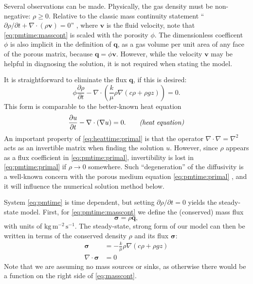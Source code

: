\documentclass[11pt]{amsart}
\newcommand{\bq}{\mathbf{q}}
\newcommand{\bv}{\mathbf{v}}
\newcommand{\bsigma}{\bm{\sigma}}
\newcommand{\Div}{\nabla\cdot}
\newcommand{\grad}{\nabla}
\begin{document}
Several observations can be made.  Physically, the gas density must be non-negative: $\rho\ge 0$.  Relative to the classic mass continuity statement ``$\partial\rho/\partial t + \Div(\rho \bv)=0$'' \citep[for example]{Tadmor2012}, where $\bv$ is the fluid velocity, note that \eqref{eq:pmtime:masscont} is scaled with the porosity $\phi$.  The dimensionless coefficent $\phi$ is also implicit in the definition of $\bq$, as a gas volume per unit area of any face of the porous matrix, because $\bq = \phi \bv$.  However, while the velocity $\bv$ may be helpful in diagnosing the solution, it is not required when stating the model.

It is straightforward to eliminate the flux $\bq$, if this is desired:
\begin{equation}
\phi \frac{\partial \rho}{\partial t} - \Div \left(\frac{k}{\mu} \rho \grad\left(c \rho + \rho g z\right)\right) = 0. \label{eq:pmtime:primal}
\end{equation}
This form is comparable to the better-known heat equation
\begin{equation}
\frac{\partial u}{\partial t} - \Div(\grad u) = 0. \qquad \text{\emph{(heat equation)}}\label{eq:heattime:primal}
\end{equation}
An important property of \eqref{eq:heattime:primal} is that the operator $\Div \grad = \grad^2$ acts as an invertible matrix when finding the solution $u$.  However, since $\rho$ appears as a flux coefficient in \eqref{eq:pmtime:primal}, invertibility is lost in \eqref{eq:pmtime:primal} if $\rho\to 0$ somewhere.  Such ``degeneration'' of the diffusivity is a well-known concern with the porous medium equation \eqref{eq:pmtime:primal} \citep[for example]{Vazquez2007}, and it will influence the numerical solution method below.

System \eqref{eq:pmtime} is time dependent, but setting $\partial \rho/\partial t = 0$ yields the steady-state model.  First, for \eqref{eq:pmtime:masscont} we define the (conserved) mass flux
\begin{equation}
\bsigma = \rho \bq, \label{eq:massflux}
\end{equation}
with units of $\text{kg}\,\text{m}^{-2}\,\text{s}^{-1}$.  The steady-state, strong form of our model can then be written in terms of the conserved density $\rho$ and its flux $\bsigma$:
\begin{subequations}
\label{eq:pm:strong}
\begin{align}
\bsigma &= - \frac{k}{\mu} \rho \grad\left(c \rho + \rho g z\right) \label{eq:darcy} \\
\Div \bsigma &= 0 \label{eq:masscont}
\end{align}
\end{subequations}
Note that we are assuming no mass sources or sinks, as otherwise there would be a function on the right side of \eqref{eq:masscont}.
\end{document}
